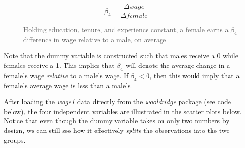 \documentclass[
]{book}
\newenvironment{Shaded}{\begin{snugshade}}{\end{snugshade}}
\newcommand{\AttributeTok}[1]{\textcolor[rgb]{0.77,0.63,0.00}{#1}}
\newcommand{\DecValTok}[1]{\textcolor[rgb]{0.00,0.00,0.81}{#1}}
\newcommand{\FunctionTok}[1]{\textcolor[rgb]{0.00,0.00,0.00}{#1}}
\newcommand{\NormalTok}[1]{#1}
\newcommand{\SpecialCharTok}[1]{\textcolor[rgb]{0.00,0.00,0.00}{#1}}
\newcommand{\StringTok}[1]{\textcolor[rgb]{0.31,0.60,0.02}{#1}}
\begin{document}
\[\beta_4 = \frac{\Delta wage}{\Delta female}\]

\begin{quote}
Holding education, tenure, and experience constant, a female earns a \(\beta_4\) difference in wage relative to a male, on average
\end{quote}

Note that the dummy variable is constructed such that males receive a 0 while females receive a 1. This implies that \(\beta_4\) will denote the average change in a female's wage \emph{relative} to a male's wage. If \(\beta_4 < 0\), then this would imply that a female's average wage is less than a male's.

After loading the \emph{wage1} data directly from the \emph{wooldridge} package (see code below), the four independent variables are illustrated in the scatter plots below. Notice that even though the dummy variable takes on only two numbers by design, we can still see how it effectively \emph{splits} the observations into the two groups.

\begin{Shaded}
\end{Shaded}
\end{document}
